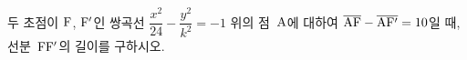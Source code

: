 두 초점이 $\mathrm{F}$, $\mathrm{F'}$인 쌍곡선 $\dfrac{x^2}{24}-\dfrac{y^2}{k^2}=-1$ 위의 점~$\mathrm{A}$에 대하여 $\overline{\mathrm{AF}}-\overline{\mathrm{AF'}}=10$일 때, 선분~$\mathrm{FF'}$의 길이를 구하시오. 
